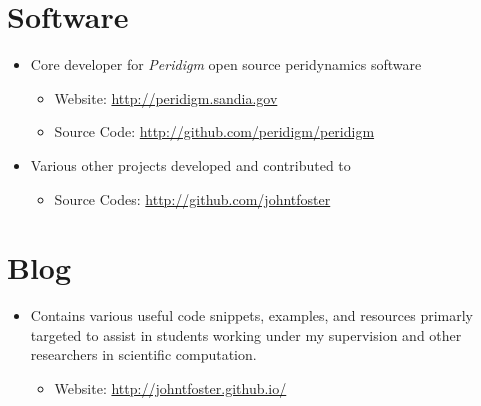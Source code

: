 \section*{Software}

\begin{itemize}
    \item Core developer for \emph{Peridigm} open source peridynamics software
        \begin{itemize}
            \item Website: \href{http://peridigm.sandia.gov}{http://peridigm.sandia.gov}
            \item Source Code: \href{http://github.com/peridigm/peridigm}{http://github.com/peridigm/peridigm}
        \end{itemize}
    \item Various other projects developed and contributed to
        \begin{itemize}
            \item Source Codes: \href{http://github.com/johntfoster}{http://github.com/johntfoster}
        \end{itemize}
\end{itemize}

\section*{Blog}

\begin{itemize}
    \item Contains various useful code snippets, examples, and resources primarly targeted to assist in students working under my supervision and other researchers in scientific computation.
        \begin{itemize}
            \item Website: \href{http://johntfoster.github.io/}{http://johntfoster.github.io/}
        \end{itemize}
\end{itemize}
